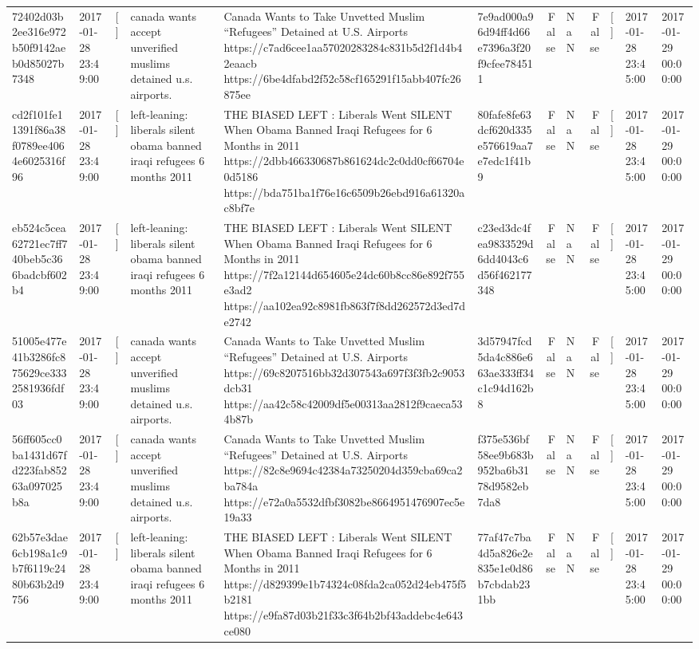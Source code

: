 \begin{tabular}{llllllrlrlll}
72402d03b2ee316e972b50f9142aeb0d85027b7348 & 2017-01-28 23:49:00 & [] & canada wants accept unverified muslims detained u.s. airports. & Canada Wants to Take Unvetted Muslim “Refugees” Detained at U.S. Airports https://c7ad6cee1aa57020283284c831b5d2f1d4b42eaacb https://6be4dfabd2f52c58cf165291f15abb407fc26875ee & 7e9ad000a96d94ff4d66e7396a3f20f9cfee784511 & False & NaN & False & [] & 2017-01-28 23:45:00 & 2017-01-29 00:00:00 \\
cd2f101fe11391f86a38f0789ee4064e6025316f96 & 2017-01-28 23:49:00 & [] & left-leaning: liberals silent obama banned iraqi refugees 6 months 2011 & THE BIASED LEFT : Liberals Went SILENT When Obama Banned Iraqi Refugees for 6 Months in 2011 https://2dbb466330687b861624dc2c0dd0cf66704e0d5186 https://bda751ba1f76e16c6509b26ebd916a61320ac8bf7e & 80fafe8fe63dcf620d335e576619aa7e7edc1f41b9 & False & NaN & False & [] & 2017-01-28 23:45:00 & 2017-01-29 00:00:00 \\
eb524c5cea62721ec7ff740beb5c366badcbf602b4 & 2017-01-28 23:49:00 & [] & left-leaning: liberals silent obama banned iraqi refugees 6 months 2011 & THE BIASED LEFT : Liberals Went SILENT When Obama Banned Iraqi Refugees for 6 Months in 2011 https://7f2a12144d654605e24dc60b8cc86e892f755e3ad2 https://aa102ea92c8981fb863f7f8dd262572d3ed7de2742 & c23ed3dc4fea9833529d6dd4043c6d56f462177348 & False & NaN & False & [] & 2017-01-28 23:45:00 & 2017-01-29 00:00:00 \\
51005e477e41b3286fc875629ce3332581936fdf03 & 2017-01-28 23:49:00 & [] & canada wants accept unverified muslims detained u.s. airports. & Canada Wants to Take Unvetted Muslim “Refugees” Detained at U.S. Airports https://69c8207516bb32d307543a697f3f3fb2c9053dcb31 https://aa42c58c42009df5e00313aa2812f9caeca534b87b & 3d57947fcd5da4c886e663ae333ff34c1c94d162b8 & False & NaN & False & [] & 2017-01-28 23:45:00 & 2017-01-29 00:00:00 \\
56ff605cc0ba1431d67fd223fab85263a097025b8a & 2017-01-28 23:49:00 & [] & canada wants accept unverified muslims detained u.s. airports. & Canada Wants to Take Unvetted Muslim “Refugees” Detained at U.S. Airports https://82c8e9694c42384a73250204d359cba69ca2ba784a https://e72a0a5532dfbf3082be8664951476907ec5e19a33 & f375e536bf58ee9b683b952ba6b3178d9582eb7da8 & False & NaN & False & [] & 2017-01-28 23:45:00 & 2017-01-29 00:00:00 \\
62b57e3dae6cb198a1c9b7f6119c2480b63b2d9756 & 2017-01-28 23:49:00 & [] & left-leaning: liberals silent obama banned iraqi refugees 6 months 2011 & THE BIASED LEFT : Liberals Went SILENT When Obama Banned Iraqi Refugees for 6 Months in 2011 https://d829399e1b74324c08fda2ca052d24eb475f5b2181 https://e9fa87d03b21f33c3f64b2bf43addebc4e643ce080 & 77af47c7ba4d5a826e2e835e1e0d86b7cbdab231bb & False & NaN & False & [] & 2017-01-28 23:45:00 & 2017-01-29 00:00:00 \\

\end{tabular}

